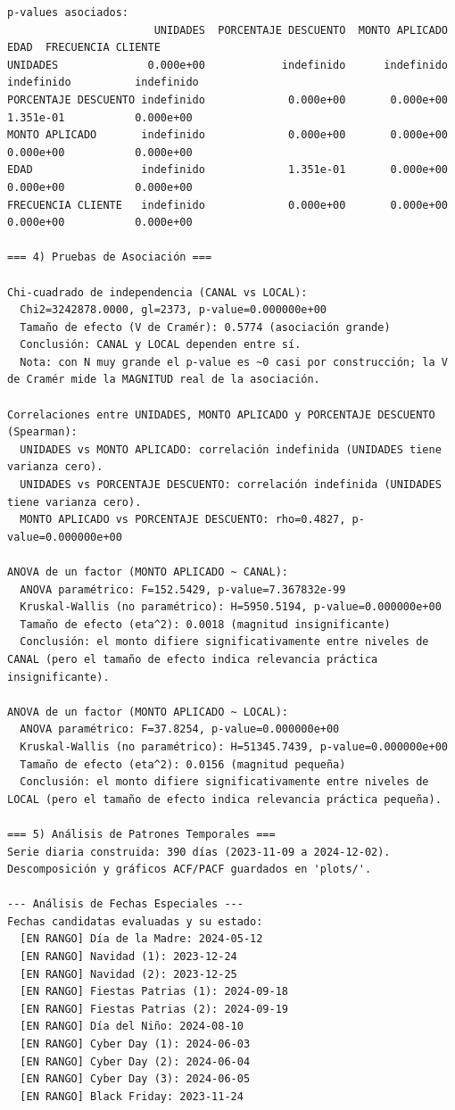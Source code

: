 \documentclass[12pt,letterpaper]{article}
\begin{document}
\begin{Verbatim}[breaklines=true,breakanywhere=true,fontsize=\scriptsize,breaksymbolleft={\tiny\ensuremath{\hookrightarrow}}]
p-values asociados:
                       UNIDADES  PORCENTAJE DESCUENTO  MONTO APLICADO       EDAD  FRECUENCIA CLIENTE
UNIDADES              0.000e+00            indefinido      indefinido indefinido          indefinido
PORCENTAJE DESCUENTO indefinido             0.000e+00       0.000e+00  1.351e-01           0.000e+00
MONTO APLICADO       indefinido             0.000e+00       0.000e+00  0.000e+00           0.000e+00
EDAD                 indefinido             1.351e-01       0.000e+00  0.000e+00           0.000e+00
FRECUENCIA CLIENTE   indefinido             0.000e+00       0.000e+00  0.000e+00           0.000e+00

=== 4) Pruebas de Asociación ===

Chi-cuadrado de independencia (CANAL vs LOCAL):
  Chi2=3242878.0000, gl=2373, p-value=0.000000e+00
  Tamaño de efecto (V de Cramér): 0.5774 (asociación grande)
  Conclusión: CANAL y LOCAL dependen entre sí.
  Nota: con N muy grande el p-value es ~0 casi por construcción; la V de Cramér mide la MAGNITUD real de la asociación.

Correlaciones entre UNIDADES, MONTO APLICADO y PORCENTAJE DESCUENTO (Spearman):
  UNIDADES vs MONTO APLICADO: correlación indefinida (UNIDADES tiene varianza cero).
  UNIDADES vs PORCENTAJE DESCUENTO: correlación indefinida (UNIDADES tiene varianza cero).
  MONTO APLICADO vs PORCENTAJE DESCUENTO: rho=0.4827, p-value=0.000000e+00

ANOVA de un factor (MONTO APLICADO ~ CANAL):
  ANOVA paramétrico: F=152.5429, p-value=7.367832e-99
  Kruskal-Wallis (no paramétrico): H=5950.5194, p-value=0.000000e+00
  Tamaño de efecto (eta^2): 0.0018 (magnitud insignificante)
  Conclusión: el monto difiere significativamente entre niveles de CANAL (pero el tamaño de efecto indica relevancia práctica insignificante).

ANOVA de un factor (MONTO APLICADO ~ LOCAL):
  ANOVA paramétrico: F=37.8254, p-value=0.000000e+00
  Kruskal-Wallis (no paramétrico): H=51345.7439, p-value=0.000000e+00
  Tamaño de efecto (eta^2): 0.0156 (magnitud pequeña)
  Conclusión: el monto difiere significativamente entre niveles de LOCAL (pero el tamaño de efecto indica relevancia práctica pequeña).

=== 5) Análisis de Patrones Temporales ===
Serie diaria construida: 390 días (2023-11-09 a 2024-12-02).
Descomposición y gráficos ACF/PACF guardados en 'plots/'.

--- Análisis de Fechas Especiales ---
Fechas candidatas evaluadas y su estado:
  [EN RANGO] Día de la Madre: 2024-05-12
  [EN RANGO] Navidad (1): 2023-12-24
  [EN RANGO] Navidad (2): 2023-12-25
  [EN RANGO] Fiestas Patrias (1): 2024-09-18
  [EN RANGO] Fiestas Patrias (2): 2024-09-19
  [EN RANGO] Día del Niño: 2024-08-10
  [EN RANGO] Cyber Day (1): 2024-06-03
  [EN RANGO] Cyber Day (2): 2024-06-04
  [EN RANGO] Cyber Day (3): 2024-06-05
  [EN RANGO] Black Friday: 2023-11-24


\end{Verbatim}
\end{document}

